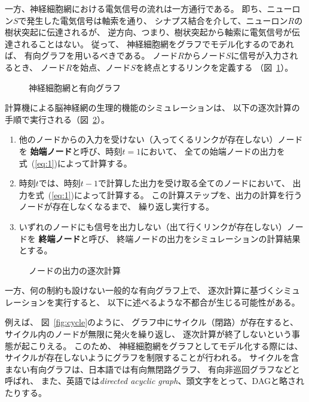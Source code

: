 一方、神経細胞網における電気信号の流れは一方通行である。
即ち、ニューロン$S$で発生した電気信号は軸索を通り、
シナプス結合を介して、ニューロン$R$の樹状突起に伝達されるが、
逆方向、つまり、樹状突起から軸索に電気信号が伝達されることはない。
従って、
神経細胞網をグラフでモデル化するのであれば、
有向グラフを用いるべきである。
ノード$R$からノード$S$に信号が入力されるとき、
ノード$R$を始点、ノード$S$を終点とするリンクを定義する
（図~\ref{fig:directed-graph}）。

\begin{figure}
  \centering
  
  \caption{神経細胞網と有向グラフ}
  \label{fig:directed-graph}
\end{figure}

計算機による脳神経網の生理的機能のシミュレーションは、
以下の逐次計算の手順で実行される（図~\ref{fig:sequential-computation}）。
\begin{enumerate}
\item 他のノードからの入力を受けない（入ってくるリンクが存在しない）ノードを
  \textbf{始端ノード}と呼び、時刻$t = 1$において、
  全ての始端ノードの出力を式~(\ref{eq:1})によって計算する。
\item 時刻$t$では、時刻$t-1$で計算した出力を受け取る全てのノードにおいて、
  出力を式~(\ref{eq:1})によって計算する。
  この計算ステップを、出力の計算を行うノードが存在しなくなるまで、
  繰り返し実行する。
\item いずれのノードにも信号を出力しない（出て行くリンクが存在しない）ノードを
  \textbf{終端ノード}と呼び、
  終端ノードの出力をシミュレーションの計算結果とする。
\end{enumerate}

\begin{figure}
  \centering
  
  \caption{ノードの出力の逐次計算}
  \label{fig:sequential-computation}
\end{figure}

一方、何の制約も設けない一般的な有向グラフ上で、
逐次計算に基づくシミュレーションを実行すると、
以下に述べるような不都合が生じる可能性がある。

例えば、
図~\ref{fig:cycle}のように、
グラフ中にサイクル（閉路）が存在すると、
サイクル内のノードが無限に発火を繰り返し、
逐次計算が終了しないという事態が起こりえる。
このため、
神経細胞網をグラフとしてモデル化する際には、
サイクルが存在しないようにグラフを制限することが行われる。
サイクルを含まない有向グラフは、日本語では有向無閉路グラフ、
有向非巡回グラフなどと呼ばれ、
また、英語では\emph{directed acyclic graph}、頭文字をとって、DAGと略されたりする。

